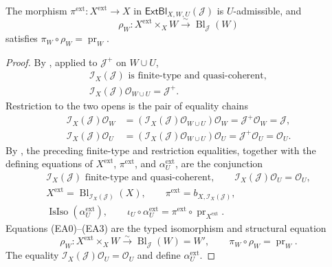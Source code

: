 \begin{lemma}
  \label{lemma:nagata-extend-admissible-blowup}

  The morphism
  $\pi^{\mathrm{ext}}\colon X^{\mathrm{ext}}\to X$ in
  $\mathsf{ExtBl}_{X,W,U}(\mathcal J)$ is $U$-admissible, and
  \[
    \rho_W\colon X^{\mathrm{ext}}\times_XW
      \xrightarrow{\sim}\operatorname{Bl}_{\mathcal J}(W)
  \]
  satisfies $\pi_W\circ\rho_W=\operatorname{pr}_W$.
\end{lemma}

\begin{proof}
  By , applied to
  $\mathcal J^+$ on $W\cup U$,
  \[
  \begin{gathered}
    \mathcal I_X(\mathcal J)
      \text{ is finite-type and quasi-coherent},\\
    \mathcal I_X(\mathcal J)\mathcal O_{W\cup U}=\mathcal J^+.
  \end{gathered}
  \]
  Restriction to the two opens is the pair of equality chains
  \[
  \begin{aligned}
    \mathcal I_X(\mathcal J)\mathcal O_W
      &=(\mathcal I_X(\mathcal J)\mathcal O_{W\cup U})\mathcal O_W
       =\mathcal J^+\mathcal O_W=\mathcal J,\\
    \mathcal I_X(\mathcal J)\mathcal O_U
      &=(\mathcal I_X(\mathcal J)\mathcal O_{W\cup U})\mathcal O_U
       =\mathcal J^+\mathcal O_U=\mathcal O_U.
  \end{aligned}
  \]
  By , the preceding finite-type and
  restriction equalities, together with the defining equations of
  $X^{\mathrm{ext}}$, $\pi^{\mathrm{ext}}$, and
  $\alpha_U^{\mathrm{ext}}$, are the conjunction
  \[
  \begin{gathered}
    \mathcal I_X(\mathcal J)\text{ finite-type and quasi-coherent},\qquad
    \mathcal I_X(\mathcal J)\mathcal O_U=\mathcal O_U,\\
    X^{\mathrm{ext}}
      =\operatorname{Bl}_{\mathcal I_X(\mathcal J)}(X),\qquad
    \pi^{\mathrm{ext}}=b_{X,\mathcal I_X(\mathcal J)},\\
    \operatorname{IsIso}(\alpha_U^{\mathrm{ext}}),\qquad
    \iota_U\circ\alpha_U^{\mathrm{ext}}
      =\pi^{\mathrm{ext}}\circ\operatorname{pr}_{X^{\mathrm{ext}}}.
  \end{gathered}
  \]
  Equations (EA0)--(EA3) are the
  typed isomorphism and structural equation
  \[
    \rho_W\colon
      X^{\mathrm{ext}}\times_XW
        \xrightarrow{\sim}\operatorname{Bl}_{\mathcal J}(W)=W',
    \qquad
    \pi_W\circ\rho_W=\operatorname{pr}_W.
  \]
  The equality
  $\mathcal I_X(\mathcal J)\mathcal O_U=\mathcal O_U$ and
   define
  $\alpha_U^{\mathrm{ext}}$.
\end{proof}

